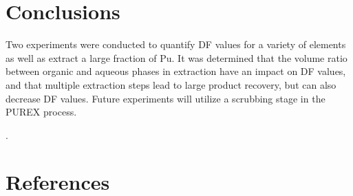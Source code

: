 \documentclass[review]{elsarticle}
\begin{document}
\section{Conclusions}
Two experiments were conducted to quantify DF values for a variety of elements as well as 
extract a large fraction of Pu. It was determined that the volume ratio between organic 
and aqueous phases in extraction have an impact on DF values, and that multiple extraction
steps lead to large product recovery, but can also decrease DF values.
Future experiments will utilize a scrubbing stage in the PUREX process.




\cite{Feynman1963118,Dirac1953888}.

\section*{References}


\end{document}
